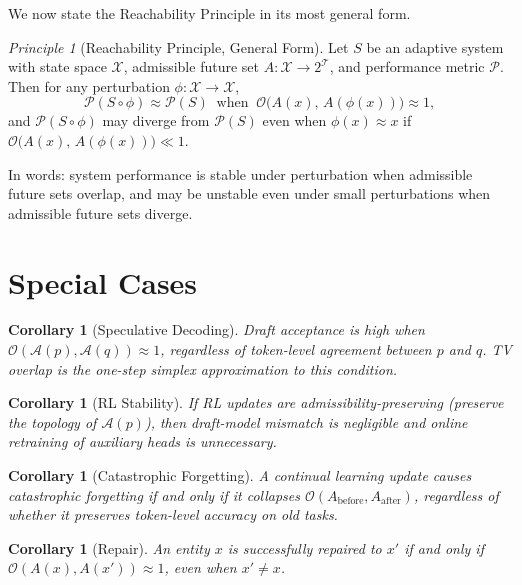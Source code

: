 \documentclass[11pt, a4paper, openany]{book}
\theoremstyle{plain}
\newtheorem{corollary}[theorem]{Corollary}
\theoremstyle{definition}
\theoremstyle{remark}
\newtheorem{principle}{Principle}
\begin{document}
We now state the Reachability Principle in its most general form.

\begin{principle}[Reachability Principle, General Form]
  \label{prin:reachability-general}
  Let $S$ be an adaptive system with state space $\mathcal{X}$,
  admissible future set $A : \mathcal{X} \to 2^{\mathcal{T}}$,
  and performance metric $\mathcal{P}$.
  Then for any perturbation $\phi : \mathcal{X} \to \mathcal{X}$,
  \[
    \mathcal{P}(S \circ \phi) \approx \mathcal{P}(S)
    \;\;\text{when}\;\;
    \mathcal{O}\!\bigl(A(x),\, A(\phi(x))\bigr) \approx 1,
  \]
  and $\mathcal{P}(S \circ \phi)$ may diverge from $\mathcal{P}(S)$
  even when $\phi(x) \approx x$ if
  $\mathcal{O}\!\bigl(A(x),\, A(\phi(x))\bigr) \ll 1$.
\end{principle}

In words: system performance is stable under perturbation when
admissible future sets overlap, and may be unstable even under
small perturbations when admissible future sets diverge.

\section{Special Cases}

\begin{corollary}[Speculative Decoding]
  Draft acceptance is high when $\mathcal{O}(\mathcal{A}(p), \mathcal{A}(q)) \approx 1$,
  regardless of token-level agreement between $p$ and $q$.
  TV overlap is the one-step simplex approximation to this condition.
\end{corollary}

\begin{corollary}[RL Stability]
  If RL updates are admissibility-preserving (preserve the topology of
  $\mathcal{A}(p)$), then draft-model mismatch is negligible and
  online retraining of auxiliary heads is unnecessary.
\end{corollary}

\begin{corollary}[Catastrophic Forgetting]
  A continual learning update causes catastrophic forgetting if and only if
  it collapses $\mathcal{O}(A_{\mathrm{before}}, A_{\mathrm{after}})$,
  regardless of whether it preserves token-level accuracy on old tasks.
\end{corollary}

\begin{corollary}[Repair]
  An entity $x$ is successfully repaired to $x'$ if and only if
  $\mathcal{O}(A(x), A(x')) \approx 1$, even when $x' \neq x$.
\end{corollary}
\end{document}
